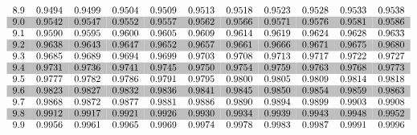 \documentclass[12pt]{article}
\begin{document}
\begin{equation*}
\begin{tabular}{*{11}{c}}
8.9 & 0.9494 & 0.9499 & 0.9504 & 0.9509 & 0.9513 & 0.9518 & 0.9523 & 0.9528 & 0.9533 & 0.9538 \\
\rowcolor[gray]{0.75}
9.0 & 0.9542 & 0.9547 & 0.9552 & 0.9557 & 0.9562 & 0.9566 & 0.9571 & 0.9576 & 0.9581 & 0.9586 \\
9.1 & 0.9590 & 0.9595 & 0.9600 & 0.9605 & 0.9609 & 0.9614 & 0.9619 & 0.9624 & 0.9628 & 0.9633 \\
\rowcolor[gray]{0.75}
9.2 & 0.9638 & 0.9643 & 0.9647 & 0.9652 & 0.9657 & 0.9661 & 0.9666 & 0.9671 & 0.9675 & 0.9680 \\
9.3 & 0.9685 & 0.9689 & 0.9694 & 0.9699 & 0.9703 & 0.9708 & 0.9713 & 0.9717 & 0.9722 & 0.9727 \\
\rowcolor[gray]{0.75}
9.4 & 0.9731 & 0.9736 & 0.9741 & 0.9745 & 0.9750 & 0.9754 & 0.9759 & 0.9763 & 0.9768 & 0.9773 \\
9.5 & 0.9777 & 0.9782 & 0.9786 & 0.9791 & 0.9795 & 0.9800 & 0.9805 & 0.9809 & 0.9814 & 0.9818 \\
\rowcolor[gray]{0.75}
9.6 & 0.9823 & 0.9827 & 0.9832 & 0.9836 & 0.9841 & 0.9845 & 0.9850 & 0.9854 & 0.9859 & 0.9863 \\
9.7 & 0.9868 & 0.9872 & 0.9877 & 0.9881 & 0.9886 & 0.9890 & 0.9894 & 0.9899 & 0.9903 & 0.9908 \\
\rowcolor[gray]{0.75}
9.8 & 0.9912 & 0.9917 & 0.9921 & 0.9926 & 0.9930 & 0.9934 & 0.9939 & 0.9943 & 0.9948 & 0.9952 \\
9.9 & 0.9956 & 0.9961 & 0.9965 & 0.9969 & 0.9974 & 0.9978 & 0.9983 & 0.9987 & 0.9991 & 0.9996 \\
\end{tabular}
\end{equation*}
\end{document}
